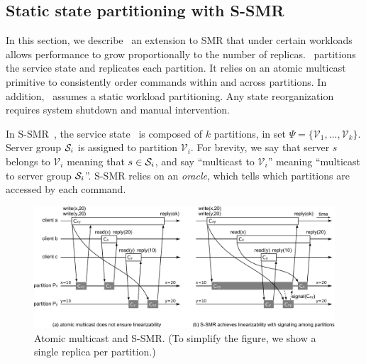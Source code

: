 \subsection{Static state partitioning with S-SMR}
\label{sec:ssmr}

In this section, we describe \ssmr\, an extension to SMR that under certain
workloads allows performance to grow proportionally to the number of replicas.
\ssmr\ partitions the service state and replicates each partition. It relies on
an atomic multicast primitive to consistently order commands within and across
partitions. In addition, \ssmr\ assumes a static workload partitioning. Any
state reorganization requires system shutdown and manual intervention.

In S-SMR~\cite{bezerra2014ssmr}, the service state \vvt\ is composed of $k$
partitions, in set $\Psi = \{\mathcal{V}_1, ..., \mathcal{V}_k\}$. Server group
$\mathcal{S}_i$ is assigned to partition $\mathcal{V}_i$. For brevity, we say that
server $s$ belongs to $\mathcal{V}_i$ meaning that $s \in \mathcal{S}_i$, and say
``multicast to $\mathcal{V}_i$'' meaning ``multicast to server group $\mathcal{S}_i$''.
S-SMR relies on an \emph{oracle}, which tells which partitions are accessed by
each command.



\begin{figure}
  \begin{minipage}[b]{1.0\linewidth}
  \centering
        \includegraphics[width=1\linewidth]{figures/ssmr}
  \end{minipage}
  \caption{Atomic multicast and S-SMR. (To simplify the figure, we show a single replica per partition.)}
  \label{fig:ssmr}
\end{figure}

